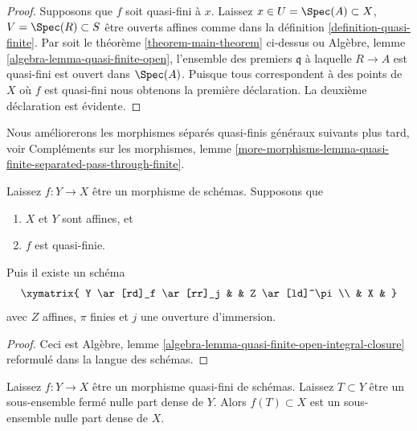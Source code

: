 \begin{proof}
Supposons que $f$ soit quasi-fini à $x$. Laissez $x \in U = \Spec(A) \subset X$, $V = \Spec(R) \subset S$ être ouverts affines comme dans la définition \ref{definition-quasi-finite}. Par soit le théorème \ref{theorem-main-theorem} ci-dessus ou Algèbre, lemme \ref{algebra-lemma-quasi-finite-open}, l'ensemble des premiers $\mathfrak q$ à laquelle $R \to A$ est quasi-fini est ouvert dans $\Spec(A)$. Puisque tous correspondent à des points de $X$ où $f$ est quasi-fini nous obtenons la première déclaration. La deuxième déclaration est évidente.
\end{proof}

\noindent
Nous améliorerons les morphismes séparés quasi-finis généraux suivants plus tard, voir Compléments sur les morphismes, lemme \ref{more-morphisms-lemma-quasi-finite-separated-pass-through-finite}.

\begin{lemma}

\label{lemma-quasi-finite-affine}
Laissez $f : Y \to X$ être un morphisme de schémas. Supposons que
\begin{enumerate}
\item $X$ et $Y$ sont affines, et
\item $f$ est quasi-finie.
\end{enumerate}
Puis il existe un schéma $$
\xymatrix{
Y \ar[rd]_f \ar[rr]_j & & Z \ar[ld]^\pi \\
& X &
}
$$ avec $Z$ affines, $\pi$ finies et $j$ une ouverture d'immersion.
\end{lemma}

\begin{proof}
Ceci est Algèbre, lemme \ref{algebra-lemma-quasi-finite-open-integral-closure} reformulé dans la langue des schémas.
\end{proof}

\begin{lemma}

\label{lemma-image-nowhere-dense-quasi-finite}
Laissez $f : Y \to X$ être un morphisme quasi-fini de schémas. Laissez $T \subset Y$ être un sous-ensemble fermé nulle part dense de $Y$. Alors $f(T) \subset X$ est un sous-ensemble nulle part dense de $X$.
\end{lemma}

